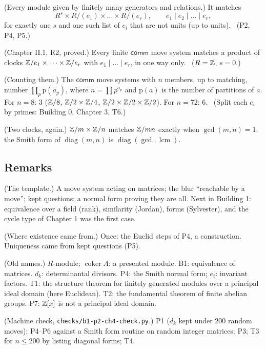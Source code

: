 \begin{lines}
\item[\lab{T1}] (Every module given by finitely many generators and relations.) It matches \[ R^{s} \times R/(e_1) \times \dots \times R/(e_r), \qquad e_1 \mid e_2 \mid \dots \mid e_r, \] for exactly one $s$ and one such list of $e_i$ that are not units (up to units). \ (P2, P4, P5.)
\item[\lab{T2}] (Chapter II.1, R2, proved.) Every finite $\mathsf{comm}$ move system matches a product of clocks $\mathbb{Z}/e_1 \times \dots \times \mathbb{Z}/e_r$ with $e_1 \mid \dots \mid e_r$, in one way only. \ ($R = \mathbb{Z}$, $s = 0$.)
\item[\lab{T3}] (Counting them.) The $\mathsf{comm}$ move systems with $n$ members, up to matching, number $\prod_p \mathrm{p}(a_p)$, where $n = \prod p^{a_p}$ and $\mathrm{p}(a)$ is the number of partitions of $a$. For $n = 8$: $3$ ($\mathbb{Z}/8$, $\mathbb{Z}/2 \times \mathbb{Z}/4$, $\mathbb{Z}/2 \times \mathbb{Z}/2 \times \mathbb{Z}/2$). For $n = 72$: $6$. \ (Split each $e_i$ by primes: Building 0, Chapter 3, T6.)
\item[\lab{T4}] (Two clocks, again.) $\mathbb{Z}/m \times \mathbb{Z}/n$ matches $\mathbb{Z}/mn$ exactly when $\gcd(m, n) = 1$: the Smith form of $\operatorname{diag}(m, n)$ is $\operatorname{diag}(\gcd, \operatorname{lcm})$.
\end{lines}

\subsection*{Remarks}

\begin{lines}
\item[\lab{R1}] (The template.) A move system acting on matrices; the blur ``reachable by a move''; kept questions; a normal form proving they are all. Next in Building 1: equivalence over a field (rank), similarity (Jordan), forms (Sylvester), and the cycle type of Chapter 1 was the first case.
\item[\lab{R2}] (Where existence came from.) Once: the Euclid steps of P4, a construction. Uniqueness came from kept questions (P5).
\item[\lab{R3}] (Old names.) $R$-module; $\operatorname{coker} A$: a presented module. B1: equivalence of matrices. $d_k$: determinantal divisors. P4: the Smith normal form; $e_i$: invariant factors. T1: the structure theorem for finitely generated modules over a principal ideal domain (here Euclidean). T2: the fundamental theorem of finite abelian groups. P7: $\mathbb{Z}[x]$ is not a principal ideal domain.
\item[\lab{R4}] (Machine check, \texttt{checks/b1-p2-ch4-check.py}.) P1 ($d_k$ kept under $200$ random moves); P4--P6 against a Smith form routine on random integer matrices; P3; T3 for $n \le 200$ by listing diagonal forms; T4.
\end{lines}

